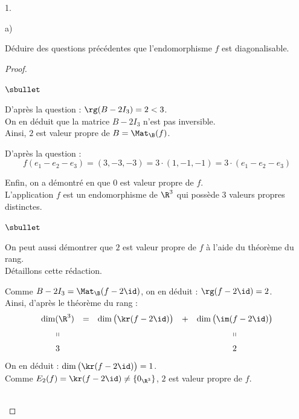 \begin{noliste}{1.}
\begin{noliste}{a)}
  \item Déduire des questions précédentes que l'endomorphisme $f$ est
    diagonalisable.

    \begin{proof}~%
      \begin{noliste}{$\sbullet$}
      \item D'après la question  : $\rg(B - 2I_3) = 2 <
        3$.\\
        On en déduit que la matrice $B - 2 I_3$ n'est pas
        inversible.\\
        Ainsi, $2$ est valeur propre de $B = \Mat_{\B}(f)$.%

      \item D'après la question  :
        \[
        f(e_1 - e_2 - e_3) = (3, -3, -3) = 3 \cdot (1, -1, -1) = 3
        \cdot (e_1 - e_2 - e_3)
        \]


        \newpage


      \item Enfin, on a démontré en  que $0$ est valeur
        propre de $f$.\\
        L'application $f$ est un endomorphisme de $\R^3$ qui possède
        $3$ valeurs propres distinctes.%
      \end{noliste}
        \begin{remark}%
          \begin{noliste}{$\sbullet$}
          \item On peut aussi démontrer que $2$ est valeur propre de
            $f$ à l'aide du théorème du rang.\\
            Détaillons cette rédaction.
          \item Comme $B - 2I_3 = \Mat_{\B}(f - 2 \id)$, on en déduit
            : $\rg(f - 2 \id) = 2$.\\
            Ainsi, d'après le théorème du rang :
            \[
            \begin{array}{ccccc}
              \dim(\R^3) & = & \dim\big( \kr(f - 2 \id) \big) & + &
              \dim\big( \im (f - 2 \id) \big) 
              \\[.2cm]
              \shortparallel & & & & \shortparallel
              \\[.2cm]
              3 & & & & 2
            \end{array}
            \]
            On en déduit : $\dim\big( \kr(f - 2 \id) \big) = 1$.\\
            Comme $E_2(f) = \kr(f - 2 \id) \neq \{ 0_{\R^3} \}$, $2$
            est valeur propre de $f$.%
          \end{noliste}
        \end{remark}~\\[-1.4cm]
    \end{proof}
  \end{noliste}
  

\end{noliste}

